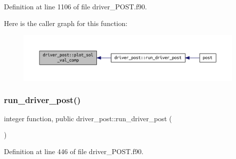 Definition at line 1106 of file driver\+\_\+\+P\+O\+S\+T.\+f90.

Here is the caller graph for this function\+:
\nopagebreak
\begin{figure}[H]
\begin{center}
\leavevmode
\includegraphics[width=350pt]{namespacedriver__post_af9ce961d2d6825b767a93fdbe8806a1c_icgraph}
\end{center}
\end{figure}
\mbox{\label{namespacedriver__post_a33b3c6f9018a0ddc92dce77394b8ab37}} 
\subsubsection{\texorpdfstring{run\+\_\+driver\+\_\+post()}{run\_driver\_post()}}
{\footnotesize\ttfamily integer function, public driver\+\_\+post\+::run\+\_\+driver\+\_\+post (\begin{DoxyParamCaption}{ }\end{DoxyParamCaption})}



Definition at line 446 of file driver\+\_\+\+P\+O\+S\+T.\+f90.

